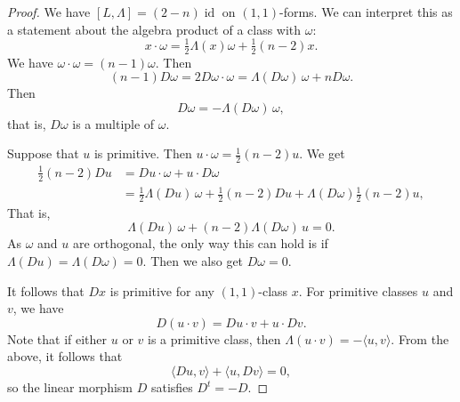 \documentclass[11pt,a4paper]{amsart}
\theoremstyle{definition}
\theoremstyle{remark}
\newcommand{\id}{\mathop{\mathrm{id}}}
\begin{document}
\begin{proof}
We have $[L, \Lambda] = (2-n)\id$ on $(1,1)$-forms. We can interpret this as a statement about the algebra product of a class with $\omega$:
$$
x \cdot \omega
= \tfrac12 \Lambda(x) \omega + \tfrac12 (n-2) x.
$$
We have $\omega \cdot \omega = (n-1) \omega$. Then
$$
(n-1) D\omega
= 2 D\omega \cdot \omega
= \Lambda(D\omega) \, \omega + n D\omega.
$$
Then
$$
D\omega = -\Lambda(D\omega) \, \omega,
$$
that is, $D\omega$ is a multiple of $\omega$.

Suppose that $u$ is primitive. Then $u \cdot \omega = \tfrac12 (n-2) u$. We get
\begin{align*}
\tfrac12 (n-2) Du
&= Du \cdot \omega + u \cdot D\omega
\\
&= \tfrac12 \Lambda(Du) \, \omega 
+ \tfrac12 (n-2) Du
 + \Lambda(D\omega) \tfrac12 (n-2) u,
\end{align*}
That is,
$$
\Lambda(Du) \, \omega + (n-2) \Lambda(D\omega) \, u = 0.
$$
As $\omega$ and $u$ are orthogonal, the only way this can hold is if $\Lambda(Du) = \Lambda(D\omega) = 0$. Then we also get $D\omega = 0$.

It follows that $Dx$ is primitive for any $(1,1)$-class $x$. For primitive classes $u$ and $v$, we have
$$
D(u \cdot v) = Du \cdot v + u \cdot Dv.
$$
Note that if either $u$ or $v$ is a primitive class, then $\Lambda(u \cdot v) = -\langle u, v \rangle$. From the above, it follows that
$$
\langle Du, v \rangle + \langle u, Dv \rangle = 0,
$$
so the linear morphism $D$ satisfies $D^t = -D$.
\end{proof}





\end{document}
